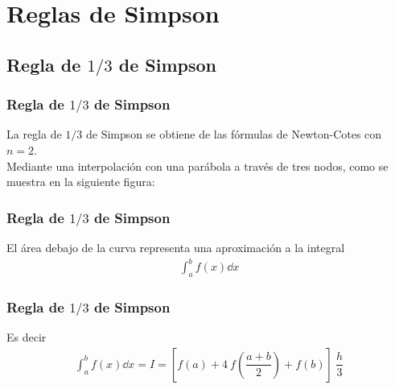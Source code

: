 \section{Reglas de Simpson}
\subsection{Regla de \texorpdfstring{$1/3$}{1/3} de Simpson}
\begin{frame}
\frametitle{Regla de $1/3$ de Simpson}
La regla de $1/3$ de Simpson se obtiene de las fórmulas de Newton-Cotes con $n = 2$.
\\
\bigskip
Mediante una interpolación con una parábola a través de tres nodos, como se muestra en la siguiente figura:
\end{frame}
\begin{frame}
\frametitle{Regla de $1/3$ de Simpson}
\begin{figure}
	\centering
	
\end{figure}
El área debajo de la curva representa una aproximación a la integral
\begin{align*}
\int_{a}^{b} f(x) \dd{x}
\end{align*}
\end{frame}
\begin{frame}
\frametitle{Regla de $1/3$ de Simpson}
Es decir
\begin{align*}
\int_{a}^{b} f(x) \dd{x} = I = \left[ f(a) + 4 \: f \left( \dfrac{a + b}{2} \right) + f(b) \right] \: \dfrac{h}{3}
\end{align*}
\end{frame}
